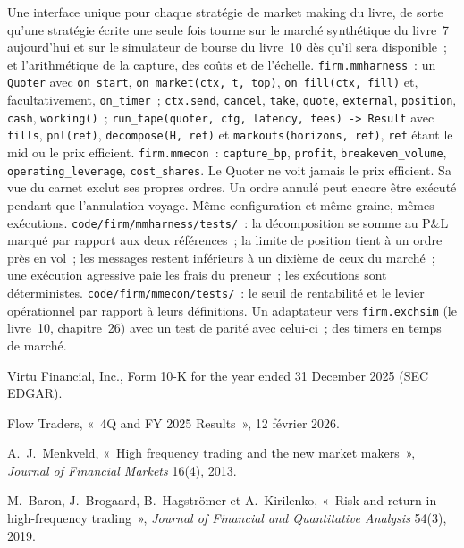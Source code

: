 \begin{build}
 Une interface unique pour chaque stratégie de market making du livre, de sorte qu'une stratégie écrite une seule fois tourne sur le marché synthétique du livre~7 aujourd'hui
et sur le simulateur de bourse du livre~10 dès qu'il sera disponible~; et l'arithmétique de la capture, des coûts et de l'échelle.
 \texttt{firm.mmharness}~: un \texttt{Quoter} avec \texttt{on\_start}, \texttt{on\_market(ctx, t, top)}, \texttt{on\_fill(ctx, fill)}
et, facultativement, \texttt{on\_timer}~; \texttt{ctx.send}, \texttt{cancel}, \texttt{take}, \texttt{quote}, \texttt{external}, \texttt{position},
\texttt{cash}, \texttt{working()}~; \texttt{run\_tape(quoter, cfg, latency, fees) -> Result} avec \texttt{fills}, \texttt{pnl(ref)},
\texttt{decompose(H, ref)} et \texttt{markouts(horizons, ref)}, \texttt{ref} étant le mid ou le prix efficient. \texttt{firm.mmecon}~:
\texttt{capture\_bp}, \texttt{profit}, \texttt{breakeven\_volume}, \texttt{operating\_leverage}, \texttt{cost\_shares}.
 Le Quoter ne voit jamais le prix efficient. Sa vue du carnet exclut ses propres ordres. Un ordre annulé peut encore être exécuté pendant que
l'annulation voyage. Même configuration et même graine, mêmes exécutions.
 \texttt{code/firm/mmharness/tests/}~: la décomposition se somme au P\&L marqué par rapport aux deux références~; la limite de position
tient à un ordre près en vol~; les messages restent inférieurs à un dixième de ceux du marché~; une exécution agressive paie les frais du preneur~; les exécutions sont déterministes.
\texttt{code/firm/mmecon/tests/}~: le seuil de rentabilité et le levier opérationnel par rapport à leurs définitions.
 Un adaptateur vers \texttt{firm.exchsim} (le livre~10, chapitre~26) avec un test de parité avec celui-ci~; des timers en temps de marché.
\end{build}

\begin{omsources}
\item Virtu Financial, Inc., Form 10-K for the year ended 31 December 2025 (SEC EDGAR).
\item Flow Traders, «~4Q and FY 2025 Results~», 12 février 2026.
\item A.~J.~Menkveld, «~High frequency trading and the new market makers~», \emph{Journal of Financial Markets} 16(4), 2013.
\item M.~Baron, J.~Brogaard, B.~Hagströmer et A.~Kirilenko, «~Risk and return in high-frequency trading~», \emph{Journal of Financial and
Quantitative Analysis} 54(3), 2019.
\end{omsources}

